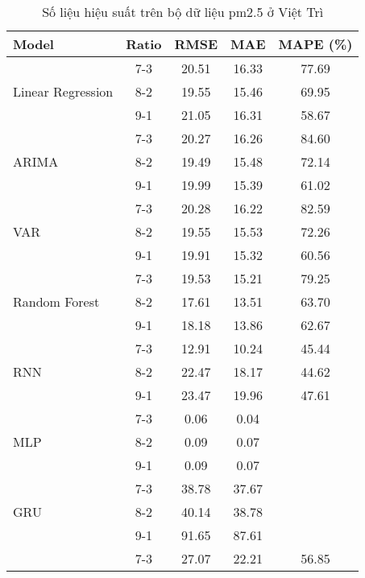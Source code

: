 \begin{table}[h!]
    \centering
    \caption{Số liệu hiệu suất trên bộ dữ liệu pm2.5 ở Việt Trì}
    \begin{tabular}{|l|c|c|c|c|}
    \hline
    \rowcolor{orange!30} \textbf{Model} & \textbf{Ratio} & \textbf{RMSE} & \textbf{MAE} & \textbf{MAPE (\%)} \\ \hline
    \rowcolor{white} & 7-3 & 20.51 & 16.33 & 77.69 \\ 
    \rowcolor{white} Linear Regression & 8-2 & 19.55 & 15.46 & 69.95 \\ 
    \rowcolor{white} & 9-1 & 21.05 & 16.31 & 58.67 \\ \hline
    \rowcolor{white} & 7-3 & 20.27 & 16.26 & 84.60 \\ 
    \rowcolor{white} ARIMA & 8-2 & 19.49 & 15.48 & 72.14 \\ 
    \rowcolor{white} & 9-1 & 19.99 & 15.39 & 61.02 \\ \hline
    \rowcolor{white} & 7-3 & 20.28 & 16.22 & 82.59 \\ 
    \rowcolor{white} VAR & 8-2 & 19.55 & 15.53 & 72.26 \\ 
    \rowcolor{white} & 9-1 & 19.91 & 15.32 & 60.56 \\ \hline
    \rowcolor{white} & 7-3 & 19.53 & 15.21 & 79.25 \\ 
    \rowcolor{white} Random Forest & 8-2 & 17.61 & 13.51 & 63.70 \\ 
    \rowcolor{white} & 9-1 & 18.18 & 13.86 & 62.67 \\ \hline
    \rowcolor{white} & 7-3 & 12.91 & 10.24 & 45.44 \\ 
    \rowcolor{white} RNN & 8-2 & 22.47 & 18.17 & 44.62 \\ 
    \rowcolor{white} & 9-1 & 23.47 & 19.96 & 47.61 \\ \hline
    \rowcolor{white} & 7-3 & 0.06 & 0.04 &  \\ 
    \rowcolor{white} MLP & 8-2 & 0.09 & 0.07 &  \\ 
    \rowcolor{white} & 9-1 & 0.09 & 0.07 &  \\ \hline
    \rowcolor{white} & 7-3 & 38.78 & 37.67 &  \\ 
    \rowcolor{white} GRU & 8-2 & 40.14 & 38.78 &  \\ 
    \rowcolor{white} & 9-1 & 91.65 & 87.61 &  \\ \hline
    \rowcolor{white} & 7-3 & 27.07 & 22.21 & 56.85 \\ 

\end{tabular}
\end{table}
